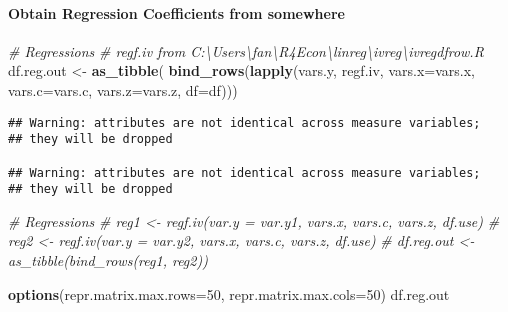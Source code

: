 \documentclass[
]{book}
\newenvironment{Shaded}{\begin{snugshade}}{\end{snugshade}}
\newcommand{\CommentTok}[1]{\textcolor[rgb]{0.56,0.35,0.01}{\textit{#1}}}
\newcommand{\DataTypeTok}[1]{\textcolor[rgb]{0.13,0.29,0.53}{#1}}
\newcommand{\DecValTok}[1]{\textcolor[rgb]{0.00,0.00,0.81}{#1}}
\newcommand{\KeywordTok}[1]{\textcolor[rgb]{0.13,0.29,0.53}{\textbf{#1}}}
\newcommand{\NormalTok}[1]{#1}
\newcommand{\StringTok}[1]{\textcolor[rgb]{0.31,0.60,0.02}{#1}}
\begin{document}
\hypertarget{obtain-regression-coefficients-from-somewhere}{%
\paragraph{Obtain Regression Coefficients from somewhere}\label{obtain-regression-coefficients-from-somewhere}}

\begin{Shaded}
\begin{Highlighting}[]
\CommentTok{# Regressions}
\CommentTok{# regf.iv from C:\textbackslash{}Users\textbackslash{}fan\textbackslash{}R4Econ\textbackslash{}linreg\textbackslash{}ivreg\textbackslash{}ivregdfrow.R}
\NormalTok{df.reg.out <-}\StringTok{ }\KeywordTok{as_tibble}\NormalTok{(}
  \KeywordTok{bind_rows}\NormalTok{(}\KeywordTok{lapply}\NormalTok{(vars.y, regf.iv,}
                   \DataTypeTok{vars.x=}\NormalTok{vars.x, }\DataTypeTok{vars.c=}\NormalTok{vars.c, }\DataTypeTok{vars.z=}\NormalTok{vars.z, }\DataTypeTok{df=}\NormalTok{df)))}
\end{Highlighting}
\end{Shaded}

\begin{verbatim}
## Warning: attributes are not identical across measure variables;
## they will be dropped

## Warning: attributes are not identical across measure variables;
## they will be dropped
\end{verbatim}

\begin{Shaded}
\begin{Highlighting}[]
\CommentTok{# Regressions}
\CommentTok{# reg1 <- regf.iv(var.y = var.y1, vars.x, vars.c, vars.z, df.use)}
\CommentTok{# reg2 <- regf.iv(var.y = var.y2, vars.x, vars.c, vars.z, df.use)}
\CommentTok{# df.reg.out <- as_tibble(bind_rows(reg1, reg2))}
\end{Highlighting}
\end{Shaded}

\begin{Shaded}
\begin{Highlighting}[]
\KeywordTok{options}\NormalTok{(}\DataTypeTok{repr.matrix.max.rows=}\DecValTok{50}\NormalTok{, }\DataTypeTok{repr.matrix.max.cols=}\DecValTok{50}\NormalTok{)}
\NormalTok{df.reg.out}
\end{Highlighting}
\end{Shaded}
\end{document}

